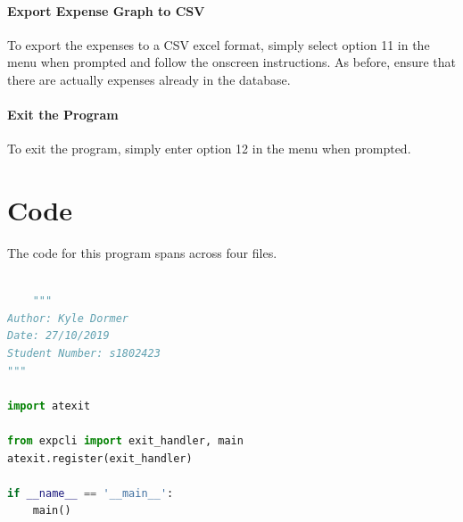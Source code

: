 \documentclass[11pt]{article}
\begin{document}
  \paragraph{Export Expense Graph to CSV}
  To export the expenses to a CSV excel format, simply select option 11 in the menu when prompted and follow the onscreen instructions. As before, ensure that there are actually expenses already in the database.
  \paragraph{Exit the Program}
  To exit the program, simply enter option 12 in the menu when prompted.
  
  \section{Code}
  The code for this program spans across four files.

  \begin{lstlisting}[language=Python, caption=Source code for \textit{\_\_main\_\_.py}.]

    """
Author: Kyle Dormer
Date: 27/10/2019
Student Number: s1802423
"""

import atexit

from expcli import exit_handler, main
atexit.register(exit_handler)

if __name__ == '__main__':
    main()

    
  \end{lstlisting}
\end{document}
